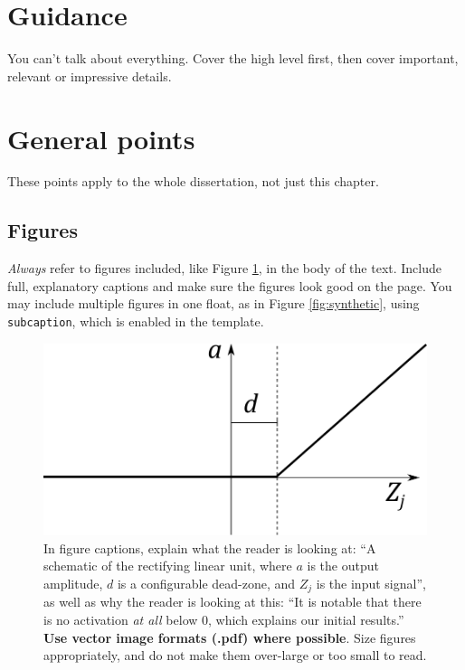 \documentclass{l4proj}
\begin{document}
\section{Guidance}
You can't talk about everything. Cover the high level first, then cover important, relevant or impressive details.


\section{General points}
These points apply to the whole dissertation, not just this chapter.


\subsection{Figures}
\emph{Always} refer to figures included, like Figure \ref{fig:relu}, in the body of the text. Include full, explanatory captions and make sure the figures look good on the page.
You may include multiple figures in one float, as in Figure \ref{fig:synthetic}, using \texttt{subcaption}, which is enabled in the template.



\begin{figure}
    \centering
    \includegraphics[width=0.5\linewidth]{images/relu.pdf}    

    \caption{In figure captions, explain what the reader is looking at: ``A schematic of the rectifying linear unit, where $a$ is the output amplitude,
    $d$ is a configurable dead-zone, and $Z_j$ is the input signal'', as well as why the reader is looking at this: 
    ``It is notable that there is no activation \emph{at all} below 0, which explains our initial results.'' 
    \textbf{Use vector image formats (.pdf) where possible}. Size figures appropriately, and do not make them over-large or too small to read.
    }

    \label{fig:relu} 
\end{figure}
\end{document}
